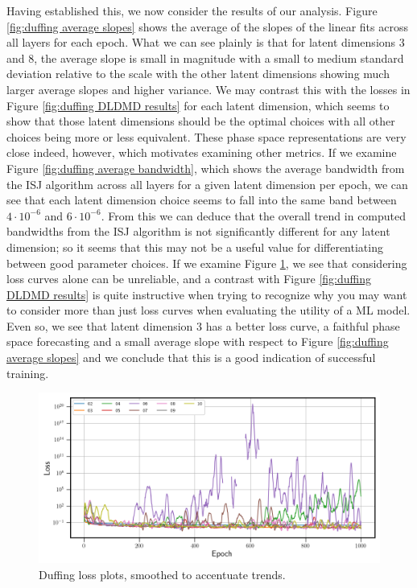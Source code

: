 Having established this, we now consider the results of our analysis.
Figure \ref{fig:duffing average slopes} shows the average of the slopes of the linear fits across 
all layers for each epoch.  What we can see plainly is that for latent dimensions 3 and 8, 
the average slope is small in magnitude with a small to medium standard deviation relative to the scale 
with the other latent dimensions showing much larger average slopes and higher variance. We may contrast this 
with the losses in Figure \ref{fig:duffing DLDMD results} for each latent 
dimension, which seems to show that those latent dimensions should be the optimal choices with all other 
choices being more or less equivalent. These phase space representations are very close indeed, however, 
which motivates examining other metrics. If we examine Figure \ref{fig:duffing average bandwidth}, which shows the average 
bandwidth from the ISJ algorithm across all layers for a given latent dimension per epoch, we can see 
that each latent dimension choice seems to fall into the same band between $4\cdot10^{-6}$ and 
$6\cdot10^{-6}$. From this we can deduce that the overall trend in computed bandwidths from the ISJ 
algorithm is not significantly different for any latent dimension; so it seems that this may not be a 
useful value for differentiating between good parameter choices. If we examine Figure \ref{fig:duffing losses},
we see that considering loss curves alone can be unreliable, and a contrast with Figure \ref{fig:duffing DLDMD results} 
is quite instructive when trying to recognize why you may want to consider more than just loss curves when 
evaluating the utility of a ML model. Even so, we see that latent dimension 3 has a better loss curve, 
a faithful phase space forecasting and a small average slope with respect to Figure \ref{fig:duffing average slopes}
and we conclude that this is a good indication of successful training.

\begin{figure}[!ht]
    \centering
    \begin{minipage}{\textwidth}
        \includegraphics[width=\textwidth]{"../Figures/duffing_loss_plots.png"} 
    \end{minipage}%
    \caption{Duffing loss plots, smoothed to accentuate trends.}
    \label{fig:duffing losses}
\end{figure}

